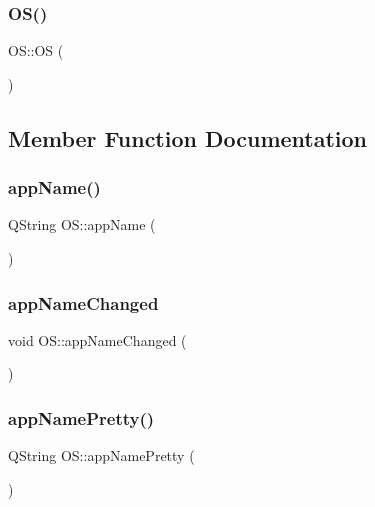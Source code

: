 \subsubsection{\texorpdfstring{OS()}{OS()}}
{\footnotesize\ttfamily O\+S\+::\+OS (\begin{DoxyParamCaption}{ }\end{DoxyParamCaption})\hspace{0.3cm}{\ttfamily [explicit]}}



\subsection{Member Function Documentation}
\mbox{\label{classOS_a414805ecb488dd84a111fb2c8c6b9401}} 
\subsubsection{\texorpdfstring{appName()}{appName()}}
{\footnotesize\ttfamily Q\+String O\+S\+::app\+Name (\begin{DoxyParamCaption}{ }\end{DoxyParamCaption})}

\mbox{\label{classOS_ad55c57724a077d427b89ede6e1f8b235}} 
\subsubsection{\texorpdfstring{appNameChanged}{appNameChanged}}
{\footnotesize\ttfamily void O\+S\+::app\+Name\+Changed (\begin{DoxyParamCaption}{ }\end{DoxyParamCaption})\hspace{0.3cm}{\ttfamily [signal]}}

\mbox{\label{classOS_af545da4fea44bc32a873f7021498b9fc}} 
\subsubsection{\texorpdfstring{appNamePretty()}{appNamePretty()}}
{\footnotesize\ttfamily Q\+String O\+S\+::app\+Name\+Pretty (\begin{DoxyParamCaption}{ }\end{DoxyParamCaption})}

